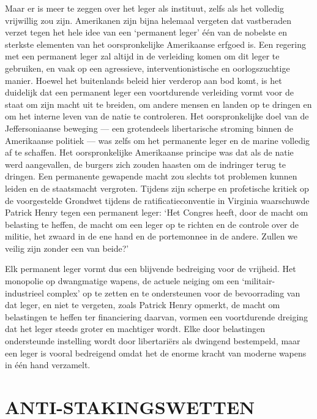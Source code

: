 \documentclass[
  a5paper,
  smalldemyvopaper,10pt,twoside,onecolumn,openright,extrafontsizes,hidelinks]{memoir}
\begin{document}
Maar er is meer te zeggen over het leger als instituut, zelfs als het
volledig vrijwillig zou zijn. Amerikanen zijn bijna helemaal vergeten
dat vastberaden verzet tegen het hele idee van een `permanent leger' één
van de nobelste en sterkste elementen van het oorspronkelijke
Amerikaanse erfgoed is. Een regering met een permanent leger zal altijd
in de verleiding komen om dit leger te gebruiken, en vaak op een
agressieve, interventionistische en oorlogszuchtige manier. Hoewel het
buitenlands beleid hier verderop aan bod komt, is het duidelijk dat een
permanent leger een voortdurende verleiding vormt voor de staat om zijn
macht uit te breiden, om andere mensen en landen op te dringen en om het
interne leven van de natie te controleren. Het oorspronkelijke doel van
de Jeffersoniaanse beweging --- een grotendeels libertarische stroming
binnen de Amerikaanse politiek --- was zelfs om het permanente leger en
de marine volledig af te schaffen. Het oorspronkelijke Amerikaanse
principe was dat als de natie werd aangevallen, de burgers zich zouden
haasten om de indringer terug te dringen. Een permanente gewapende macht
zou slechts tot problemen kunnen leiden en de staatsmacht vergroten.
Tijdens zijn scherpe en profetische kritiek op de voorgestelde Grondwet
tijdens de ratificatieconventie in Virginia waarschuwde Patrick Henry
tegen een permanent leger: `Het Congres heeft, door de macht om
belasting te heffen, de macht om een leger op te richten en de controle
over de militie, het zwaard in de ene hand en de portemonnee in de
andere. Zullen we veilig zijn zonder een van beide?'

Elk permanent leger vormt dus een blijvende bedreiging voor de vrijheid.
Het monopolie op dwangmatige wapens, de actuele neiging om een
`militair-industrieel complex' op te zetten en te ondersteunen voor de
bevoorrading van dat leger, en niet te vergeten, zoals Patrick Henry
opmerkt, de macht om belastingen te heffen ter financiering daarvan,
vormen een voortdurende dreiging dat het leger steeds groter en
machtiger wordt. Elke door belastingen ondersteunde instelling wordt
door libertariërs als dwingend bestempeld, maar een leger is vooral
bedreigend omdat het de enorme kracht van moderne wapens in één hand
verzamelt.

\section{\texorpdfstring{\textbf{ANTI-STAKINGSWETTEN}}{ANTI-STAKINGSWETTEN}}\label{anti-stakingswetten}
\end{document}
